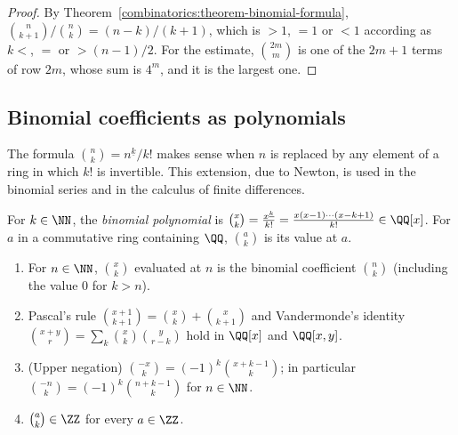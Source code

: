 \begin{proof}
By Theorem~\ref{combinatorics:theorem-binomial-formula}, $\binom{n}{k+1}\big/\binom{n}{k} = (n - k)/(k + 1)$, which is $> 1$, $= 1$ or $< 1$ according as $k < $, $=$ or $> (n - 1)/2$. For the estimate,
$\binom{2m}{m}$ is one of the $2m + 1$ terms of row $2m$, whose sum is $4^m$, and it is the largest one.
\end{proof}

\subsection{Binomial coefficients as polynomials}\label{combinatorics:subsection-binomial-polynomials}

The formula $\binom{n}{k} = n^{\underline{k}}/k!$ makes sense when $n$ is replaced by any element of a ring in which $k!$ is invertible. This extension, due to Newton, is used in the binomial series
and in the calculus of finite differences.

\begin{definition}\label{combinatorics:definition-binomial-polynomial}
For $k \in \NN$, the \emph{binomial polynomial} is $\binom{x}{k} = \frac{x^{\underline{k}}}{k!} = \frac{x(x - 1) \cdots (x - k + 1)}{k!} \in \QQ[x]$. For $a$ in a commutative ring containing $\QQ$,
$\binom{a}{k}$ is its value at $a$.
\end{definition}

\begin{proposition}\label{combinatorics:proposition-binomial-polynomial}
\begin{enumerate}
\item For $n \in \NN$, $\binom{x}{k}$ evaluated at $n$ is the binomial coefficient $\binom{n}{k}$ (including the value $0$ for $k > n$).
\item Pascal's rule $\binom{x + 1}{k + 1} = \binom{x}{k} + \binom{x}{k + 1}$ and Vandermonde's identity $\binom{x + y}{r} = \sum_k\binom{x}{k}\binom{y}{r - k}$ hold in $\QQ[x]$ and $\QQ[x, y]$.
\item (Upper negation) $\binom{-x}{k} = (-1)^k\binom{x + k - 1}{k}$; in particular $\binom{-n}{k} = (-1)^k\binom{n + k - 1}{k}$ for $n \in \NN$.
\item $\binom{a}{k} \in \ZZ$ for every $a \in \ZZ$.
\end{enumerate}
\end{proposition}

